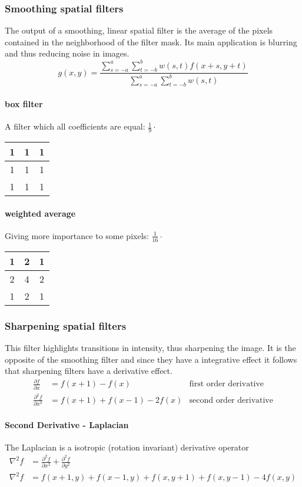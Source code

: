 \subsubsection{Smoothing spatial filters}
The output of a smoothing, linear spatial filter is the average of the pixels contained in the neighborhood of the filter mask.
Its main application is blurring and thus reducing noise in images.
\begin{equation}
g(x,y) = \frac{\sum\limits_{s=-a}^{a}\sum\limits_{t=-b}^{b}w(s,t) f(x+s, y+t)}{\sum\limits_{s=-a}^{a}\sum\limits_{t=-b}^{b}w(s,t)}
\end{equation}
\paragraph{box filter}
A filter which all coefficients are equal:
$ \frac{1}{9} \cdot$ \begin{tabular}{|c|c|c|} \hline 1 & 1 & 1 \\ \hline 1 & 1 & 1 \\ \hline 1 & 1 & 1  \\ \hline \end{tabular}
\paragraph{weighted average}
Giving more importance to some pixels:
$ \frac{1}{16} \cdot$ \begin{tabular}{|c|c|c|} \hline 1 & 2 & 1 \\ \hline 2 & 4 & 2 \\ \hline 1 & 2 & 1  \\ \hline \end{tabular}
\subsubsection{Sharpening spatial filters}
This filter highlights transitions in intensity, thus sharpening the image.
It is the opposite of the smoothing filter and since they have a integrative effect it follows that sharpening filters have a derivative effect.
\begin{align}
\frac{\partial f}{\partial x} &= f(x+1) - f(x)& \text{first order derivative} \\
\frac{\partial^2 f}{\partial x^2} &= f(x+1) + f(x-1)  -2 f(x)& \text{second order derivative}
\end{align}

\paragraph{Second Derivative - Laplacian}
The Laplacian is a isotropic (rotation invariant) derivative operator
\begin{align}
\nabla^2f &= \frac{\partial^2 f}{\partial x^2} + \frac{\partial^2 f}{\partial y^2} \\
\nabla^2f &= f(x+1,y) + f(x-1,y) + f(x,y+1) + f(x,y-1) - 4 f(x,y)
\end{align}


